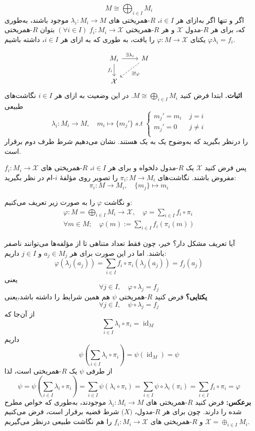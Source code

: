 \noindent
\[
    M \cong \bigoplus_{i \in I} M_i
\]
اگر و تنها اگر
به‌ازای هر
\(i\in I\)،
{\(R\)-همریختی }های
\(\lambda_i : M_i \to M\)
موجود باشند، به‌طوری که، برای هر
{\(R\)-مدول }
\(\mathcal{X}\)
و هر
{\(R\)-همریختی }
\((\forall i\in I) \; f_i : M_i \to \mathcal{X}\)
بتوان
{\(R\)-همریختی }
یکتای
\(\varphi: M \to \mathcal{X}\)
را یافت، به طوری که به ازای هر
\(i\in I\)،
داشته باشیم
\(\varphi\lambda_i=f_i\).

\[
    \begin{tikzcd}
        M_i \arrow{r}{\exists\lambda_i} \arrow[swap]{d}{f_i} & M \arrow[dashed]{dl}{\exists! \varphi} \\
        \mathcal{X} &
    \end{tikzcd}
\]
\textbf{اثبات. }
ابتدا فرض کنید
$M \cong \bigoplus_{i \in I} M_i$.
در این وضعیت به ازای هر \(i \in I\) نگاشت‌های طبیعی
\[
    \lambda_i: M_i \to M, \quad m_i \mapsto \{m_j'\} \; s.t \;
    \begin{cases}
        m_j' = m_i & \; j = i    \\
        m_j' = 0   & \; j \neq i \\
    \end{cases}
\]
را درنظر بگیرید که به‌وضوح یک به یک هستند.
نشان می‌دهیم شرط طرف دوم برقرار است.

پس فرض کنید $\mathcal{X}$ یک $R$-مدول دلخواه و
برای هر $i \in I$،
$R$-همریختی های
$f_i : M_i \to \mathcal{X}$
مفروض باشند.
نگاشت‌های
$\pi_i : M \to M_i$
را تصویر روی مؤلفهٔ
\(i\)-ام
در نظر بگیرید:
\[
    \pi_i : M \to M_i, \quad \{m_j\} \mapsto m_i
\]

و نگاشت $\varphi$ را به صورت زیر تعریف می‌کنیم:
\[
    \begin{aligned}
        \varphi : M = \bigoplus_{i \in I} M_i \to \mathcal{X}, \quad \varphi = \sum_{i \in I} f_i \circ \pi_i \\
        \forall m \in M; \quad \varphi(m) := \sum_{i \in I} f_i(\pi_i(m))
    \end{aligned}
\]

آیا تعریف مشکل دار؟
خیر، چون فقط تعداد متناهی تا از مؤلفه‌ها می‌توانند ناصفر باشند.
اما در این صورت برای هر $a_j \in M_j$ و $j \in I$ داریم:
\[
    \varphi  (\lambda_j(a_j))= \sum_{i \in I} f_i \circ \pi_i (\lambda_j(a_j))  = f_j(a_j)
\]
یعنی
\[
    \forall j \in I, \quad \varphi \circ \lambda_j = f_j
\]
\textbf{یکتایی؟}
فرض کنید
$R$-همریختی
\(\psi\)
هم همین شرایط را داشته باشد،‌یعنی
\[
    \forall j \in I, \quad \psi \circ \lambda_j = f_j
\]
از آن‌جا که
\[
    \sum_{i \in I} \lambda_i \circ \pi_i = \operatorname{id}_M
\]
داریم
\[
    \psi\left( \sum_{i \in I} \lambda_i \circ \pi_i \right) = \psi(\operatorname{id}_M) = \psi
\]
از طرفی
\(\psi\)
یک
$R$-همریختی
است، لذا
\[
    \psi
    = \psi\left( \sum_{i \in I} \lambda_i \circ \pi_i \right)
    = \sum_{i \in I} \psi (\lambda_i \circ \pi_i)
    = \sum_{i \in I} \psi \circ \lambda_i  (\pi_i)
    = \sum_{i \in I} f_i \circ \pi_i
    = \varphi
\]
\textbf{برعکس:}
فرض کنید
$R$-همریختی
های
\(\lambda_i:M_i\to M\)
موجودند، به‌طوری که خواص مطرح شده را دارند. چون برای هر
$R$-مدول،
\(\mathcal(X)\)
شرط قضیه برقرار است، فرض می‌کنیم
\(\mathcal{X} = \oplus_{i\in I}M_i\)
و
$R$-همریختی
های
\(f_i:M_i\to \mathcal{X}\)
را هم نگاشت طبیعی درنظر می‌گیریم.

